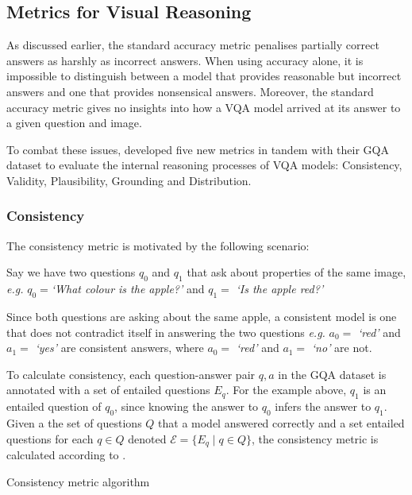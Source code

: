 \subsection{Metrics for Visual Reasoning}

As discussed earlier, the standard accuracy metric penalises partially correct answers as harshly as incorrect answers. When using accuracy alone, it is impossible to distinguish between a model that provides reasonable but incorrect answers and one that provides nonsensical answers. Moreover, the standard accuracy metric gives no insights into how a VQA model arrived at its answer to a given question and image.

To combat these issues, \citeauthor{hudson2019gqa} developed five new metrics in tandem with their GQA dataset \cite{hudson2019gqa} to evaluate the internal reasoning processes of VQA models: Consistency, Validity, Plausibility, Grounding and Distribution.

\subsubsection{Consistency}

The consistency metric is motivated by the following scenario:

Say we have two questions \(q_0\) and \(q_1\) that ask about properties of the same image, \textit{e.g.} \(q_0 = \)\textit{`What colour is the apple?'} and  \(q_1 = \) \textit{`Is the apple red?'}

Since both questions are asking about the same apple, a consistent model is one that does not contradict itself in answering the two questions \textit{e.g.} \(a_0 =\) \textit{`red'} and \(a_1 =\) \textit{`yes'} are consistent answers, where \(a_0 =\) \textit{`red'} and \(a_1 =\) \textit{`no'} are not.

To calculate consistency, each question-answer pair \(q, a\) in the GQA dataset is annotated with a set of entailed questions \(E_q\). For the example above, \(q_1\) is an entailed question of \(q_0\), since knowing the answer to \(q_0\) infers the answer to \(q_1\). Given a the set of questions \(Q\) that a model answered correctly and a set entailed questions for each \(q \in Q\) denoted \(\mathcal{E} = \{E_q \mid q \in Q\}\), the consistency metric is calculated according to \algorithmcfname{ \ref{algorithm:consistency}}.

\begin{algorithm}[htbp]
    \caption[Consistency metric algorithm]{Consistency metric algorithm}
    \label{algorithm:consistency}
\end{algorithm}

